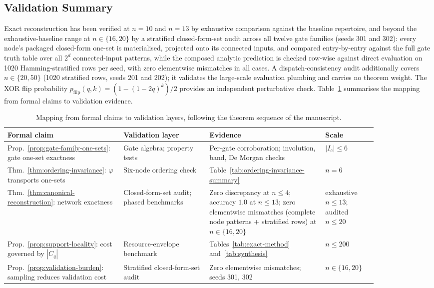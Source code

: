 \documentclass[11pt]{article}
\theoremstyle{definition}
\newcommand{\Ic}{I_c}
\begin{document}
\subsection{Validation Summary}

Exact reconstruction has been verified at $n=10$ and $n=13$ by exhaustive comparison against the baseline repertoire, and beyond the exhaustive-baseline range at $n\in\{16,20\}$ by a stratified closed-form-set audit across all twelve gate families (seeds 301 and 302): every node's packaged closed-form one-set is materialised, projected onto its connected inputs, and compared entry-by-entry against the full gate truth table over all $2^{d}$ connected-input patterns, while the composed analytic prediction is checked row-wise against direct evaluation on 1020 Hamming-stratified rows per seed, with zero elementwise mismatches in all cases. A dispatch-consistency audit additionally covers $n\in\{20,50\}$ (1020 stratified rows, seeds 201 and 202); it validates the large-scale evaluation plumbing and carries no theorem weight. The XOR flip probability $p_{\mathrm{flip}}(q,k) = (1-(1-2q)^k)/2$ provides an independent perturbative check. Table~\ref{tab:validation-map} summarises the mapping from formal claims to validation evidence.

\begin{table}[h]
\centering
\small
\begin{tabular}{p{0.27\linewidth}p{0.20\linewidth}p{0.27\linewidth}p{0.12\linewidth}}
\toprule
\textbf{Formal claim} & \textbf{Validation layer} & \textbf{Evidence} & \textbf{Scale} \\
\midrule
Prop.~\ref{prop:gate-family-one-sets}: gate one-set exactness &
Gate algebra; property tests &
Per-gate corroboration; involution, band, De Morgan checks &
\(|\Ic|\leq 6\) \\[3pt]
Thm.~\ref{thm:ordering-invariance}: \(\varphi\) transports one-sets &
Six-node ordering check &
Table~\ref{tab:ordering-invariance-summary} &
\(n=6\) \\[3pt]
Thm.~\ref{thm:canonical-reconstruction}: network exactness &
Closed-form-set audit; phased benchmarks &
Zero discrepancy at \(n\leq 4\); accuracy \(1.0\) at \(n\leq 13\); zero elementwise mismatches (complete node patterns + stratified rows) at \(n\in\{16,20\}\) &
exhaustive \(n\leq 13\); audited \(n\leq 20\) \\[3pt]
Prop.~\ref{prop:support-locality}: cost governed by \(|C_q|\) &
Resource-envelope benchmark &
Tables~\ref{tab:exact-method} and~\ref{tab:synthesis} &
\(n\leq 200\) \\[3pt]
Prop.~\ref{prop:validation-burden}: sampling reduces validation cost &
Stratified closed-form-set audit &
Zero elementwise mismatches; seeds 301, 302 &
\(n\in\{16,20\}\) \\
\bottomrule
\end{tabular}
\caption{Mapping from formal claims to validation layers, following the theorem sequence of the manuscript.}
\label{tab:validation-map}
\end{table}
\end{document}
